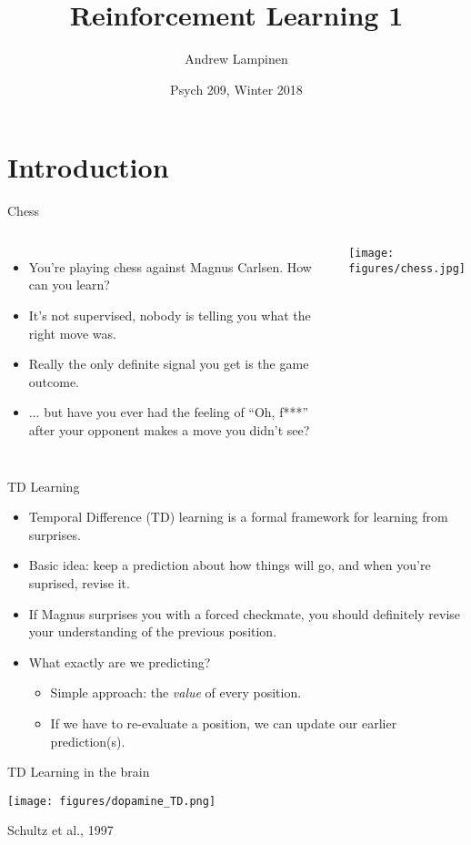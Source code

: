 \documentclass{beamer}
\begin{document}
\title{Reinforcement Learning 1}
\author{Andrew Lampinen}
\date{Psych 209, Winter 2018}
\frame{\titlepage}


\section{Introduction}
\begin{frame}{Chess}
\begin{columns}
\begin{itemize}
    \item<1-> You're playing chess against Magnus Carlsen. How can you learn?
    \item<2-> It's not supervised, nobody is telling you what the right move was.
    \item<3-> Really the only definite signal you get is the game outcome.
    \item<4-> ... but have you ever had the feeling of ``Oh, f***'' after your opponent makes a move you didn't see?
\end{itemize}
    \begin{center}
    \texttt{[image: figures/chess.jpg]}
    \end{center}
\end{columns}
\end{frame}

\begin{frame}{TD Learning}
\begin{itemize}
    \item<1-> Temporal Difference (TD) learning is a formal framework for learning from surprises. 
    \item<2-> Basic idea: keep a prediction about how things will go, and when you're suprised, revise it. 
    \item<3-> If Magnus surprises you with a forced checkmate, you should definitely revise your understanding of the previous position.
    \item<4-> What exactly are we predicting? 
    \begin{itemize}
        \item<5-> Simple approach: the \emph{value} of every position.
        \item<6-> If we have to re-evaluate a position, we can update our earlier prediction(s).
    \end{itemize}
\end{itemize}
\end{frame}

\begin{frame}{TD Learning in the brain}
    \begin{center}
    \texttt{[image: figures/dopamine\_TD.png]}
    \end{center}
    {\tiny Schultz et al., 1997}
\end{frame}
\end{document}

